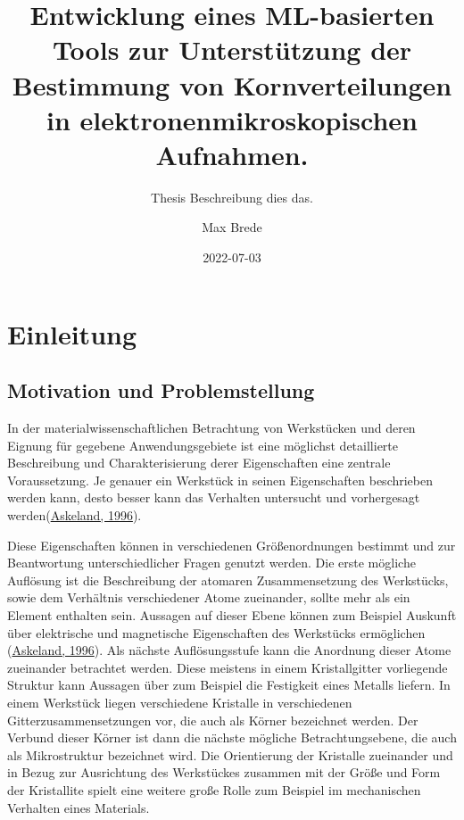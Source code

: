 \documentclass[
  12pt,
]{book}
\title{Entwicklung eines ML-basierten Tools zur Unterstützung der Bestimmung von Kornverteilungen in elektronenmikroskopischen Aufnahmen.}
\subtitle{Thesis Beschreibung dies das.}
\author{Max Brede}
\date{2022-07-03}
\begin{document}
\maketitle

\renewcommand*\contentsname{Inhalt}
{
\setcounter{tocdepth}{1}
\tableofcontents
}
\listoffigures
\listoftables
{}
\hypertarget{einleitung}{%
\chapter{Einleitung}\label{einleitung}}

\hypertarget{motivation-und-problemstellung}{%
\section{Motivation und Problemstellung}\label{motivation-und-problemstellung}}

In der materialwissenschaftlichen Betrachtung von Werkstücken und deren Eignung für gegebene Anwendungsgebiete ist eine möglichst detaillierte Beschreibung und Charakterisierung derer Eigenschaften eine zentrale Voraussetzung. Je genauer ein Werkstück in seinen Eigenschaften beschrieben werden kann, desto besser kann das Verhalten untersucht und vorhergesagt werden(\protect\hyperlink{ref-askelandMaterialwissenschaftenGrundlagenUbungen1996}{Askeland, 1996}).

Diese Eigenschaften können in verschiedenen Größenordnungen bestimmt und zur Beantwortung unterschiedlicher Fragen genutzt werden.
Die erste mögliche Auflösung ist die Beschreibung der atomaren Zusammensetzung des Werkstücks, sowie dem Verhältnis verschiedener Atome zueinander, sollte mehr als ein Element enthalten sein. Aussagen auf dieser Ebene können zum Beispiel Auskunft über elektrische und magnetische Eigenschaften des Werkstücks ermöglichen (\protect\hyperlink{ref-askelandMaterialwissenschaftenGrundlagenUbungen1996}{Askeland, 1996}).
Als nächste Auflösungsstufe kann die Anordnung dieser Atome zueinander betrachtet werden. Diese meistens in einem Kristallgitter vorliegende Struktur kann Aussagen über zum Beispiel die Festigkeit eines Metalls liefern.
In einem Werkstück liegen verschiedene Kristalle in verschiedenen Gitterzusammensetzungen vor, die auch als Körner bezeichnet werden.
Der Verbund dieser Körner ist dann die nächste mögliche Betrachtungsebene, die auch als Mikrostruktur bezeichnet wird. Die Orientierung der Kristalle zueinander und in Bezug zur Ausrichtung des Werkstückes zusammen mit der Größe und Form der Kristallite spielt eine weitere große Rolle zum Beispiel im mechanischen Verhalten eines Materials.
\end{document}
